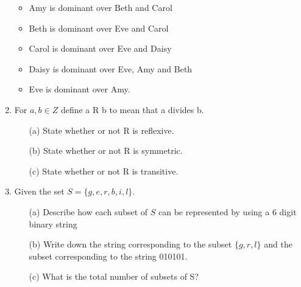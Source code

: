 \documentclass[]{report}
\begin{document}
\begin{enumerate}
\begin{itemize}
\item Amy is dominant over Beth and Carol
\item Beth is dominant over Eve and Carol
\item Carol is dominant over Eve and Daisy
\item Daisy is dominant over Eve, Amy and Beth
\item Eve is dominant over Amy.
\end{itemize}


\item 
For $a, b \in Z$ define a R b to mean that a divides b.

\begin{itemize}
\item[(a)] State whether or not R is reflexive.
\item[(b)] State whether or not R is symmetric.
\item[(c)] State whether or not R is transitive.
\end{itemize}
% 


\item 
Given the set $S =\{g,e,r,b,i,l\}$.
\begin{itemize}
\item[(a)] Describe how each subset of $S$ can be represented by using a 6 digit binary string
\item[(b)] Write down the string corresponding to the subset $\{g,r,l\}$ and the subset corresponding to the string 010101.
\item[(c)] What is the total number of subsets of S?
\end{itemize}

\end{enumerate}
\end{document}

